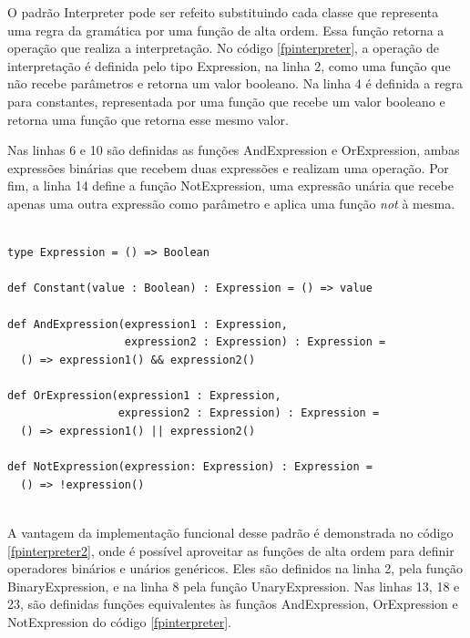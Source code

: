 O padrão Interpreter pode ser refeito substituindo 
cada classe que representa uma regra da gramática 
por uma função de alta ordem. Essa função retorna a 
operação que realiza a interpretação. No código 
\ref{fpinterpreter}, a operação de interpretação 
é definida pelo tipo Expression, na linha 2, como 
uma função que não recebe parâmetros e retorna um 
valor booleano. Na linha 4 é definida a regra para 
constantes, representada por uma função que recebe 
um valor booleano e retorna uma função que retorna 
esse mesmo valor.

Nas linhas 6 e 10 são definidas as funções 
AndExpression e OrExpression, ambas expressões 
binárias que recebem duas expressões e realizam 
uma operação. Por fim, a linha 14 define a função 
NotExpression, uma expressão unária que recebe 
apenas uma outra expressão como parâmetro e 
aplica uma função \textit{not} à mesma.

\begin{lstlisting}[caption={Interpreter Funcional},label=fpinterpreter]
    
type Expression = () => Boolean

def Constant(value : Boolean) : Expression = () => value
  
def AndExpression(expression1 : Expression,
                  expression2 : Expression) : Expression =
  () => expression1() && expression2()
  
def OrExpression(expression1 : Expression,
                 expression2 : Expression) : Expression =
  () => expression1() || expression2()
  
def NotExpression(expression: Expression) : Expression =
  () => !expression()
    
\end{lstlisting}

A vantagem da implementação funcional desse 
padrão é demonstrada no código \ref{fpinterpreter2}, 
onde é possível aproveitar as funções de alta 
ordem para definir operadores binários e unários 
genéricos. Eles são definidos na linha 2, pela função 
BinaryExpression, e na linha 8 pela função 
UnaryExpression. Nas linhas 13, 18 e 23, são 
definidas funções equivalentes às funçãos 
AndExpression, OrExpression e NotExpression do 
código \ref{fpinterpreter}.

